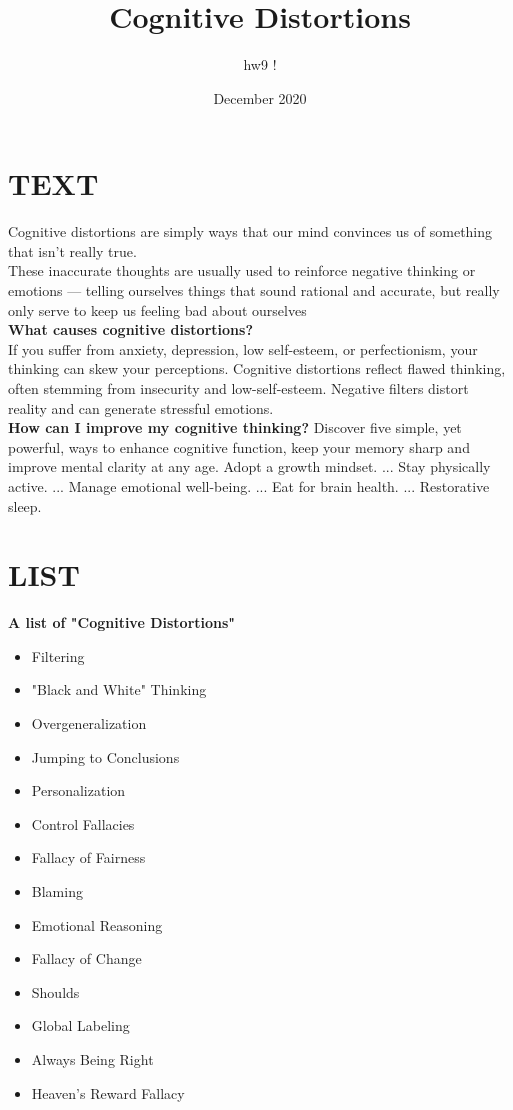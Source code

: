 \documentclass[12pt]{article}
\title{Cognitive Distortions}
\author{hw9 ! }
\date{December 2020}
\begin{document}
\maketitle

\section{TEXT}

Cognitive distortions are simply ways that our mind convinces us of something that isn't really true.\\ These inaccurate thoughts are usually used to reinforce negative thinking or emotions — telling ourselves things that sound rational and accurate, but really only serve to keep us feeling bad about ourselves\\\newline
\textbf{What causes cognitive distortions?}\\ If you suffer from anxiety, depression, low self-esteem, or perfectionism, your thinking can skew your perceptions. Cognitive distortions reflect flawed thinking, often stemming from insecurity and low-self-esteem. Negative filters distort reality and can generate stressful emotions.\\\newline
\textbf{How can I improve my cognitive thinking?}
Discover five simple, yet powerful, ways to enhance cognitive function, keep your memory sharp and improve mental clarity at any age.
Adopt a growth mindset. ...
Stay physically active. ...
Manage emotional well-being. ...
Eat for brain health. ...
Restorative sleep.\newpage
\section{LIST}
\bf{A list of "Cognitive Distortions"}
\begin{itemize}
  \item Filtering
  \item "Black and White" Thinking
  \item Overgeneralization
  \item Jumping to Conclusions
  \item Personalization
  \item Control Fallacies
  \item Fallacy of Fairness
  \item Blaming
  \item Emotional Reasoning
  \item Fallacy of Change
  \item Shoulds
  \item Global Labeling
  \item Always Being Right
  \item Heaven’s Reward Fallacy
\end{itemize}
\end{document}
